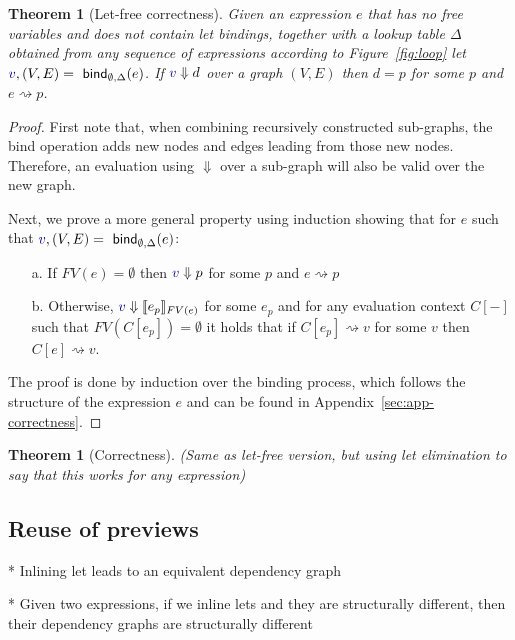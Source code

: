 \documentclass[sigplan,10pt]{acmart}\settopmatter{printfolios=true,printccs=false,printacmref=false}
\newcounter{thc}
\theoremstyle{plain}
\newtheorem{theorem}[thc]{Theorem}
\theoremstyle{definition}
\newcommand{\ident}[1]{\textnormal{\sffamily #1}}
\newcommand{\bndclr}[1]{\textcolor{kvdclr}{#1}}
\begin{document}
\begin{theorem}[Let-free correctness]
Given an expression $e$ that has no free variables and does not contain let bindings, together
with a lookup table $\Delta$ obtained from any sequence of expressions according to Figure~\ref{fig:loop}
let $\bndclr{v}, (V, E) = \ident{bind}_{\emptyset, \Delta}(e)$. If $\bndclr{v}\Downarrow d$ 
over a graph $(V, E)$ then $d = p$ for some $p$ and $e \rightsquigarrow p$.
\end{theorem}
\begin{proof}
First note that, when combining recursively constructed sub-graphs, the \ident{bind} operation
adds new nodes and edges leading from those new nodes. Therefore, an evaluation using $\Downarrow$
over a sub-graph will also be valid over the new graph.

Next, we prove a more general property using induction showing that for $e$ such 
that $\bndclr{v}, (V, E) = \ident{bind}_{\emptyset, \Delta}(e)$:
\begin{enumerate}
\item[a.] If $FV(e)=\emptyset$ then $\bndclr{v} \Downarrow p$ for some $p$ and $e \rightsquigarrow p$
\item[b.] Otherwise, $\bndclr{v} \Downarrow \llbracket e_p \rrbracket_{FV(e)}$ for some $e_p$ and
  for any evaluation context $C[-]$ such that $FV(C[e_p])=\emptyset$ it holds that if
  $C[e_p] \rightsquigarrow v$ for some $v$ then $C[e] \rightsquigarrow v$.  
\end{enumerate}
The proof is done by induction over the binding process, which follows the structure 
of the expression $e$ and can be found in Appendix~\ref{sec:app-correctness}.
\end{proof}


\begin{theorem}[Correctness]
\label{thm:correctness}
(Same as let-free version, but using let elimination to say that this works for any expression)
\end{theorem}

\subsection{Reuse of previews}
\label{sec:properties-reuse}


* Inlining let leads to an equivalent dependency graph

* Given two expressions, if we inline lets and they are structurally different, then 
  their dependency graphs are structurally different
\end{document}
